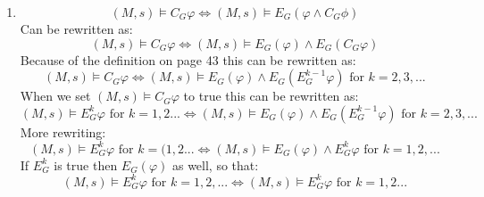 \documentclass[12pt]{article} %
\begin{document}
\begin{enumerate}
    \item 
        \begin{equation}
            (M,s) \models C_G\varphi \Leftrightarrow (M,s) \models E_G(\varphi \wedge
            C_G\phi) 
        \end{equation}
        Can be rewritten as:
        \begin{equation}
            (M,s) \models C_G\varphi \Leftrightarrow (M,s) \models E_G(\varphi) \wedge
            E_G (C_G\varphi) 
        \end{equation}
        Because of the definition on page 43 this can be rewritten as:
        \begin{equation}
            (M,s) \models C_G\varphi \Leftrightarrow (M,s) \models E_G(\varphi) \wedge
            E_G(E_G^{k-1}\varphi) \mbox{ for } k = 2,3, ... 
        \end{equation}
        When we set $(M,s)\models C_G\varphi$ to true this can be rewritten as:
        \begin{equation}
            (M,s) \models E_G^k\varphi  \mbox{ for } k = 1,2 ... \Leftrightarrow (M,s) \models E_G(\varphi) \wedge
            E_G(E_G^{k-1}\varphi) \mbox{ for } k = 2, 3, ... 
        \end{equation}
        More rewriting:
        \begin{equation}
            (M,s) \models E_G^k\varphi  \mbox{ for } k = (1,2 ... \Leftrightarrow (M,s) \models E_G(\varphi) \wedge
            E_G^{k}\varphi 	\mbox{ for } k = 1, 2, ...  
        \end{equation}
        If $E_G^k$ is true then $E_G(\varphi)$ as well, so that:
        \begin{equation}
            (M,s) \models E_G^k\varphi  \mbox{ for } k = 1, 2, ... \Leftrightarrow (M,s)
            \models
            E_G^{k}\varphi \mbox{ for } k = 1, 2...  
        \end{equation}


\end{enumerate}
\end{document}
